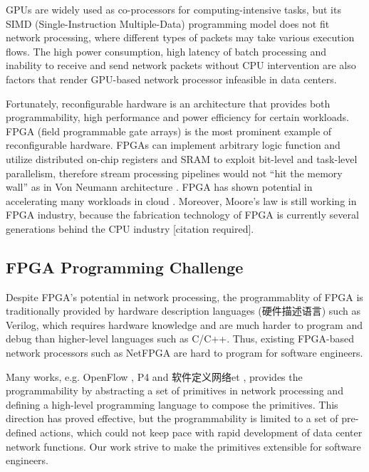 {GPUs are widely used as co-processors for computing-intensive tasks, but its SIMD (Single-Instruction Multiple-Data) programming model does not fit network processing, where different types of packets may take various execution flows. The high power consumption, high latency of batch processing and inability to receive and send network packets without CPU intervention are also factors that render GPU-based network processor infeasible in data centers.

Fortunately, reconfigurable hardware is an architecture that provides both programmability, high performance and power efficiency for certain workloads. FPGA (field programmable gate arrays) is the most prominent example of reconfigurable hardware. FPGAs can implement arbitrary logic function and utilize distributed on-chip registers and SRAM to exploit bit-level and task-level parallelism, therefore stream processing pipelines would not ``hit the memory wall'' as in Von Neumann architecture \cite{bacon2013fpga}. FPGA has shown potential in accelerating many workloads in cloud \cite{putnam2014reconfigurable}. Moreover, Moore's law is still working in FPGA industry, because the fabrication technology of FPGA is currently several generations behind the CPU industry [citation required].

\subsection{FPGA Programming Challenge}

Despite FPGA's potential in network processing, the programmablity of FPGA is traditionally provided by hardware description languages (硬件描述语言) such as Verilog, which requires hardware knowledge and are much harder to program and debug than higher-level languages such as C/C++. Thus, existing FPGA-based network processors such as NetFPGA \cite{lockwood2007netfpga} are hard to program for software engineers.

Many works, e.g. OpenFlow \cite{mckeown2008openflow}, P4 \cite{bosshart2014p4} and 软件定义网络et \cite{xilinxsdnet}, provides the programmability by abstracting a set of primitives in network processing and defining a high-level programming language to compose the primitives. This direction has proved effective, but the programmability is limited to a set of pre-defined actions, which could not keep pace with rapid development of data center network functions. Our work strive to make the primitives extensible for software engineers.

}
